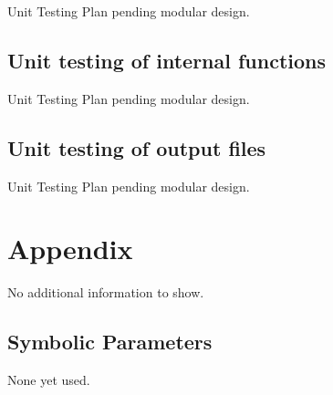 \documentclass[12pt, titlepage]{article}
\begin{document}
Unit Testing Plan pending modular design.
		
\subsection{Unit testing of internal functions}

Unit Testing Plan pending modular design.
		
\subsection{Unit testing of output files}

Unit Testing Plan pending modular design.		





\newpage

\section{Appendix}

No additional information to show.

\subsection{Symbolic Parameters}

None yet used.
\end{document}
